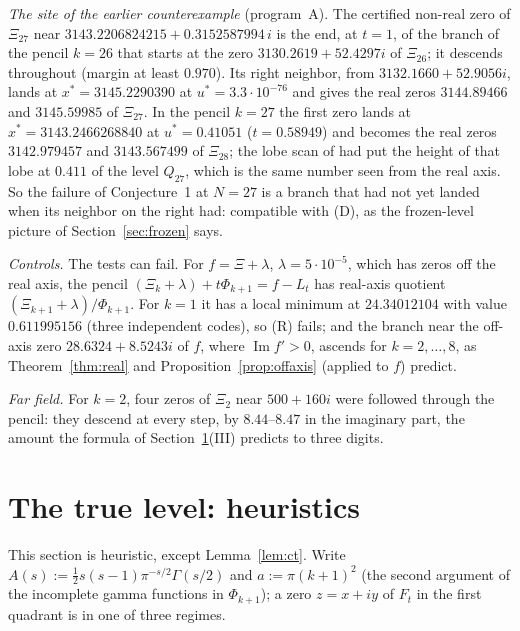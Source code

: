 \documentclass[11pt]{article}
\theoremstyle{plain}
\theoremstyle{definition}
\theoremstyle{remark}
\newcommand{\im}{\operatorname{Im}}
\begin{document}
\emph{The site of the earlier counterexample} (program~A). The certified
non-real zero of $\Xi_{27}$ near $3143.2206824215 + 0.3152587994\,i$
\cite[Theorem~1.1]{Tya} is the end, at $t = 1$, of the branch of the pencil
$k = 26$ that starts at the zero $3130.2619 + 52.4297i$ of $\Xi_{26}$; it
descends throughout (margin at least $0.970$). Its right neighbor, from
$3132.1660 + 52.9056i$, lands at $x^* = 3145.2290390$ at
$u^* = 3.3\cdot10^{-76}$ and gives the real zeros $3144.89466$ and $3145.59985$
of $\Xi_{27}$. In the pencil $k = 27$ the first zero lands at
$x^* = 3143.2466268840$ at $u^* = 0.41051$ ($t = 0.58949$) and becomes the real
zeros $3142.979457$ and $3143.567499$ of $\Xi_{28}$; the lobe scan of
\cite[Section~5]{Tya} had put the height of that lobe at $0.411$ of the level $Q_{27}$,
which is the same number seen from the real axis. So the failure of
Conjecture~1 at $N = 27$ is a branch that had not yet landed when its neighbor
on the right had: compatible with (D), as the frozen-level picture of
Section~\ref{sec:frozen} says.

\emph{Controls.} The tests can fail. For $f = \Xi + \lambda$,
$\lambda = 5\cdot10^{-5}$, which has zeros off the real axis, the pencil
$(\Xi_k + \lambda) + t\Phi_{k+1} = f - L_t$ has real-axis quotient
$(\Xi_{k+1} + \lambda)/\Phi_{k+1}$. For $k = 1$ it has a local minimum at
$24.34012104$ with value $0.611995156$ (three independent codes), so (R) fails;
and the branch near the off-axis zero $28.6324 + 8.5243i$ of $f$, where
$\im f' > 0$, ascends for $k = 2, \ldots, 8$, as Theorem~\ref{thm:real} and
Proposition~\ref{prop:offaxis} (applied to $f$) predict.

\emph{Far field.} For $k = 2$, four zeros of $\Xi_2$ near $500 + 160i$ were
followed through the pencil: they descend at every step, by $8.44$--$8.47$ in
the imaginary part, the amount the formula of Section~\ref{sec:heur}(III)
predicts to three digits.

\section{The true level: heuristics}\label{sec:heur}

This section is heuristic, except Lemma~\ref{lem:ct}. Write
$A(s) := \frac12 s(s-1)\pi^{-s/2}\Gamma(s/2)$ and $a := \pi(k+1)^2$ (the
second argument of the incomplete gamma functions in $\Phi_{k+1}$); a zero
$z = x + iy$ of $F_t$ in the first quadrant is in one of three regimes.
\end{document}
